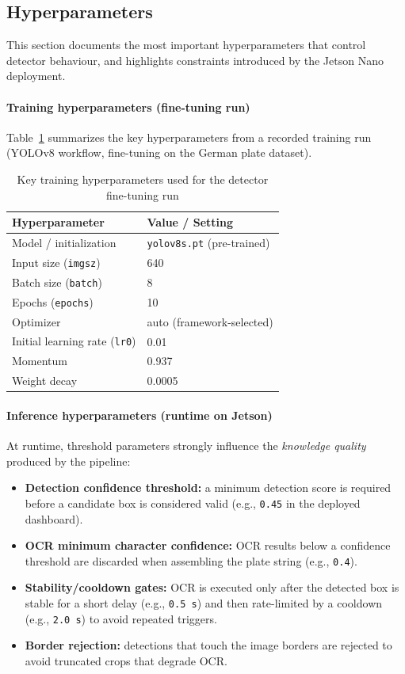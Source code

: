 \subsection{Hyperparameters}
\label{subsec:kdd_hyperparameters}

This section documents the most important hyperparameters that control detector behaviour, and highlights constraints introduced by the Jetson Nano deployment.

\paragraph{Training hyperparameters (fine-tuning run)}
Table~\ref{tab:kdd_train_hyperparams} summarizes the key hyperparameters from a recorded training run (YOLOv8 workflow, fine-tuning on the German plate dataset).

\begin{table}[htbp]
	\centering
	\caption{Key training hyperparameters used for the detector fine-tuning run}
	\label{tab:kdd_train_hyperparams}
	\begin{tabular}{@{}ll@{}}
		\toprule
		\textbf{Hyperparameter} & \textbf{Value / Setting} \\ \midrule
		Model / initialization & \texttt{yolov8s.pt} (pre-trained) \\
		Input size (\texttt{imgsz}) & 640 \\
		Batch size (\texttt{batch}) & 8 \\
		Epochs (\texttt{epochs}) & 10 \\
		Optimizer & auto (framework-selected) \\
		Initial learning rate (\texttt{lr0}) & 0.01 \\
		Momentum & 0.937 \\
		Weight decay & 0.0005 \\
		\bottomrule
	\end{tabular}
\end{table}

\paragraph{Inference hyperparameters (runtime on Jetson)}
At runtime, threshold parameters strongly influence the \textit{knowledge quality} produced by the pipeline:
\begin{itemize}
	\item \textbf{Detection confidence threshold:} a minimum detection score is required before a candidate box is considered valid (e.g., \texttt{0.45} in the deployed dashboard).
	\item \textbf{OCR minimum character confidence:} OCR results below a confidence threshold are discarded when assembling the plate string (e.g., \texttt{0.4}).
	\item \textbf{Stability/cooldown gates:} OCR is executed only after the detected box is stable for a short delay (e.g., \texttt{0.5 s}) and then rate-limited by a cooldown (e.g., \texttt{2.0 s}) to avoid repeated triggers.
	\item \textbf{Border rejection:} detections that touch the image borders are rejected to avoid truncated crops that degrade OCR.
\end{itemize}

